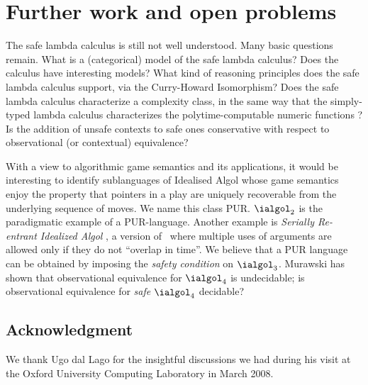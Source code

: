 
\section{Further work and open problems}

The safe lambda calculus is still not well understood. Many basic
questions remain. What is a (categorical) model of the safe lambda
calculus? Does the calculus have interesting models?  What kind of
reasoning principles does the safe lambda calculus support, via the
Curry-Howard Isomorphism? Does the safe lambda calculus characterize
a complexity class, in the same way that the simply-typed lambda
calculus characterizes the polytime-computable numeric functions
\cite{DBLP:conf/tlca/LeivantM93}?  Is the addition of unsafe
contexts to safe ones conservative with respect to observational (or
contextual) equivalence?

With a view to algorithmic game semantics and its applications, it
would be interesting to identify sublanguages of Idealised Algol
whose game semantics enjoy the property that pointers in a play are
uniquely recoverable from the underlying sequence of moves. We name
this class PUR. $\ialgol_2$ is the paradigmatic example of a
PUR-language. Another example is \emph{Serially Re-entrant Idealized
  Algol} \cite{abramsky:mchecking_ia}, a version of \ialgol\ where
multiple uses of arguments are allowed only if they do not ``overlap
in time''.  We believe that a PUR language can be obtained by
imposing the \emph{safety condition} on $\ialgol_3$. Murawski
\cite{Murawski2003} has shown that observational equivalence for
$\ialgol_4$ is undecidable; is observational equivalence for
\emph{safe} $\ialgol_4$ decidable?


\subsection*{Acknowledgment} We thank Ugo
dal Lago for the insightful discussions we had during his visit at
the Oxford University Computing Laboratory in March 2008.
